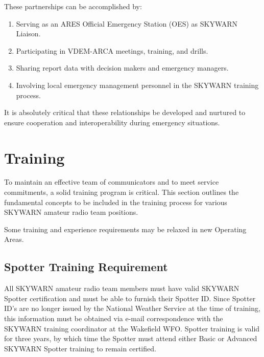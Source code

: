 \documentclass[pdflatex,letterpaper,twoside,12pt]{book}
\begin{document}
These partnerships can be accomplished by:

\begin{enumerate} 
\item Serving as an ARES Official Emergency Station (OES) as SKYWARN Liaison.
\item Participating in VDEM-ARCA meetings, training, and drills.
\item Sharing report data with decision makers and emergency managers.
\item Involving local emergency management personnel in the SKYWARN training process.
\end{enumerate}

It is absolutely critical that these relationships be developed and nurtured to ensure cooperation and interoperability during emergency situations.


\chapter{Training}

To maintain an effective team of communicators and to meet service commitments, a solid training program is critical.  This section outlines the fundamental concepts to be included in the training process for various SKYWARN amateur radio team positions.

Some training and experience requirements may be relaxed in new Operating Areas.


\section{Spotter Training Requirement}

All SKYWARN amateur radio team members must have valid SKYWARN Spotter certification and must be able to furnish their Spotter ID.  Since Spotter ID's are no longer issued by the National Weather Service at the time of training, this information must be obtained via e-mail correspondence with the SKYWARN training coordinator at the Wakefield WFO.  Spotter training is valid for three years, by which time the Spotter must attend either Basic or Advanced SKYWARN Spotter training to remain certified.
\end{document}
